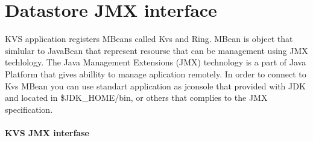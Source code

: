 \section{Datastore JMX interface}
KVS application registers MBeans called Kvs and Ring. MBean is object that simlular to JavaBean that represent resourse
that can be management using JMX techlology.
The Java Management Extensions (JMX) technology is a part of Java Platform that gives abillity to manage aplication remotely.
In order to connect to Kvs MBean you can use standart application as jconsole that provided with JDK and located in
\$JDK_HOME/bin, or others  that complies to the JMX specification.


\paragraph{KVS JMX interfase}
